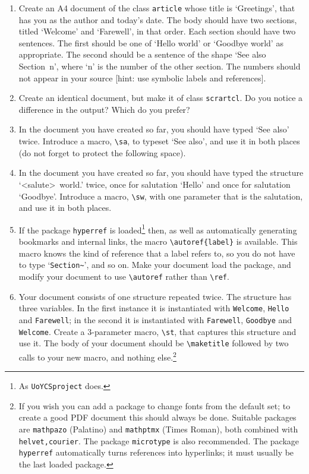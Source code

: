 \documentclass[12pt,14paper]{scrartcl}
\begin{document}
\begin{enumerate}
\item Create an A4 document of the class \lstinline{article} whose
  title is `Greetings', that has you as the author and today's date.
  The body should have two sections, titled `Welcome' and `Farewell',
  in that order.  Each section should have two sentences.  The first
  should be one of `Hello world' or `Goodbye world' as appropriate.
  The second should be a sentence of the shape `See also Section~n',
  where `n' is the number of the other section.  The numbers should
  not appear in your source [hint: use symbolic labels and
  references].
\item Create an identical document, but make it of class
  \lstinline{scrartcl}.  Do you notice a difference in the output?
  Which do you prefer?
\item In the document you have created so far, you should have typed
  `See also' twice.  Introduce a macro, \lstinline{\sa}, to typeset
  `See also', and use it in both places (do not forget to protect the
  following space).
\item In the document you have created so far, you should have typed
  the structure `\textless salute\textgreater\ world.' twice, once for
  salutation `Hello' and once for salutation `Goodbye'.  Introduce a
  macro, \lstinline{\sw}, with one parameter that is the salutation,
  and use it in both places.
\item If the package \lstinline{hyperref} is loaded\footnote{As
    \lstinline{UoYCSproject} does.} then, as well as automatically
  generating bookmarks and internal links, the macro
  \lstinline|\autoref{label}| is available.  This macro knows the kind
  of reference that a label refers to, so you do not have to type
  `\lstinline|Section~|', and so on.  Make your document load the
  package, and modify your document to use \lstinline{\autoref} rather
  than \lstinline{\ref}.
\item Your document consists of one structure repeated twice.  The
  structure has three variables.  In the first instance it is
  instantiated with \lstinline{Welcome}, \lstinline{Hello} and
  \lstinline{Farewell}; in the second it is instantiated with
  \lstinline{Farewell}, \lstinline{Goodbye} and \lstinline{Welcome}.
  Create a 3-parameter macro, \lstinline{\st}, that captures this
  structure and use it.  The body of your document should be
  \lstinline{\maketitle} followed by two calls to your new macro, and
  nothing else.\footnote{If you wish you can add a package to change
    fonts from the default set; to create a good PDF document this
    should always be done.  Suitable packages are \lstinline{mathpazo}
    (Palatino) and \lstinline{mathptmx} (Times Roman), both combined
    with \lstinline{helvet,courier}.  The package
    \lstinline{microtype} is also recommended.  The package
    \lstinline{hyperref} automatically turns references into
    hyperlinks; it must usually be the last loaded package.}
\end{enumerate}
\end{document}
